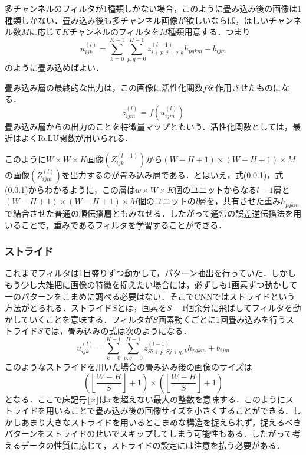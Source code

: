 \documentclass[a4paper,11pt]{jsreport}
\begin{document}
多チャンネルのフィルタが1種類しかない場合，このように畳み込み後の画像は1種類しかない．畳み込み後も多チャンネル画像が欲しいならば，ほしいチャンネル数$M$に応じて$K$チャンネルのフィルタを$M$種類用意する．つまり
\begin{equation}
  u_{ijk}^{(l)}
  = \sum_{k=0}^{K-1}\sum_{p,q=0}^{H-1} z_{i+p,j+q,k}^{(l-1)} h_{pqkm} + b_{ijm}
\end{equation}
のように畳み込めばよい．\par
畳み込み層の最終的な出力は，この画像に活性化関数$f$を作用させたものになる．
\begin{equation}
  z_{ijm}^{(l)}
  = f(u_{ijm}^{(l)})
\end{equation}
畳み込み層からの出力のことを特徴量マップともいう．活性化関数としては，最近はよくReLU関数が用いられる．\par
このように$W \times W \times K$画像$(Z_{ijk}^{(l-1)})$から$(W-H+1) \times (W-H+1) \times M$の画像$(Z_{ijm}^{(l)})$を出力するのが畳み込み層である．とはいえ，式(\ref{})，式(\ref{})からわかるように，この層は$w \times W \times K$個のユニットからなる$l-1$層と$(W-H+1) \times (W-H+1) \times M$個のユニットの$l$層を，共有させた重み${h_{pqkm}}$で結合させた普通の順伝播層ともみなせる．したがって通常の誤差逆伝播法を用いることで，重みであるフィルタを学習することができる．
\subsubsection{ストライド}
これまでフィルタは1目盛りずつ動かして，パターン抽出を行っていた．しかしもう少し大雑把に画像の特徴を捉えたい場合には，必ずしも1画素ずつ動かして一のパターンをこまめに調べる必要はない．そこでCNNではストライドという方法がとられる．ストライド$S$とは，画素を$S-1$個余分に飛ばしてフィルタを動かしていくことを意味する．フィルタが$S$画素動くごとに1回畳み込みを行うストライド$S$では，畳み込みの式は次のようになる．
\begin{equation}
  u_{ijk}^{(l)}
  = \sum_{k=0}^{K-1}\sum_{p,q=0}^{H-1} z_{Si+p,Sj+q,k}^{(l-1)} h_{pqkm} + b_{ijm}
\end{equation}
このようなストライドを用いた場合の畳み込み後の画像のサイズは
\begin{equation}
  \left(\left\lfloor \frac{W-H}{S} \right\rfloor + 1\right) \times \left(\left\lfloor \frac{W-H}{S} \right\rfloor + 1\right)
\end{equation}
となる．ここで床記号$\lfloor x \rfloor$は$x$を超えない最大の整数を意味する．このようにストライドを用いることで畳み込み後の画像サイズを小さくすることができる．しかしあまり大きなストライドを用いるとこまめな構造を捉えられず，捉えるべきパターンをストライドのせいでスキップしてしまう可能性もある．したがって考えるデータの性質に応じて，ストライドの設定には注意を払う必要がある．
\end{document}

